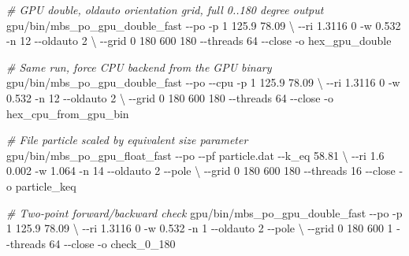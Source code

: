 \documentclass[
  10pt,
  a4paper,
]{article}
\newenvironment{Shaded}{}{}
\newcommand{\AttributeTok}[1]{\textcolor[rgb]{0.49,0.56,0.16}{#1}}
\newcommand{\CommentTok}[1]{\textcolor[rgb]{0.38,0.63,0.69}{\textit{#1}}}
\newcommand{\DataTypeTok}[1]{\textcolor[rgb]{0.56,0.13,0.00}{#1}}
\newcommand{\ExtensionTok}[1]{#1}
\newcommand{\NormalTok}[1]{#1}
\begin{document}
\begin{Shaded}
\begin{Highlighting}[]
\CommentTok{\# GPU double, oldauto orientation grid, full 0..180 degree output}
\ExtensionTok{gpu/bin/mbs\_po\_gpu\_double\_fast} \AttributeTok{{-}{-}po} \AttributeTok{{-}p}\NormalTok{ 1 125.9 78.09 }\DataTypeTok{\textbackslash{}}
    \AttributeTok{{-}{-}ri}\NormalTok{ 1.3116 0 }\AttributeTok{{-}w}\NormalTok{ 0.532 }\AttributeTok{{-}n}\NormalTok{ 12 }\AttributeTok{{-}{-}oldauto}\NormalTok{ 2 }\DataTypeTok{\textbackslash{}}
    \AttributeTok{{-}{-}grid}\NormalTok{ 0 180 600 180 }\AttributeTok{{-}{-}threads}\NormalTok{ 64 }\AttributeTok{{-}{-}close} \AttributeTok{{-}o}\NormalTok{ hex\_gpu\_double}

\CommentTok{\# Same run, force CPU backend from the GPU binary}
\ExtensionTok{gpu/bin/mbs\_po\_gpu\_double\_fast} \AttributeTok{{-}{-}po} \AttributeTok{{-}{-}cpu} \AttributeTok{{-}p}\NormalTok{ 1 125.9 78.09 }\DataTypeTok{\textbackslash{}}
    \AttributeTok{{-}{-}ri}\NormalTok{ 1.3116 0 }\AttributeTok{{-}w}\NormalTok{ 0.532 }\AttributeTok{{-}n}\NormalTok{ 12 }\AttributeTok{{-}{-}oldauto}\NormalTok{ 2 }\DataTypeTok{\textbackslash{}}
    \AttributeTok{{-}{-}grid}\NormalTok{ 0 180 600 180 }\AttributeTok{{-}{-}threads}\NormalTok{ 64 }\AttributeTok{{-}{-}close} \AttributeTok{{-}o}\NormalTok{ hex\_cpu\_from\_gpu\_bin}

\CommentTok{\# File particle scaled by equivalent size parameter}
\ExtensionTok{gpu/bin/mbs\_po\_gpu\_float\_fast} \AttributeTok{{-}{-}po} \AttributeTok{{-}{-}pf}\NormalTok{ particle.dat }\AttributeTok{{-}{-}k\_eq}\NormalTok{ 58.81 }\DataTypeTok{\textbackslash{}}
    \AttributeTok{{-}{-}ri}\NormalTok{ 1.6 0.002 }\AttributeTok{{-}w}\NormalTok{ 1.064 }\AttributeTok{{-}n}\NormalTok{ 14 }\AttributeTok{{-}{-}oldauto}\NormalTok{ 2 }\AttributeTok{{-}{-}pole} \DataTypeTok{\textbackslash{}}
    \AttributeTok{{-}{-}grid}\NormalTok{ 0 180 600 180 }\AttributeTok{{-}{-}threads}\NormalTok{ 16 }\AttributeTok{{-}{-}close} \AttributeTok{{-}o}\NormalTok{ particle\_keq}

\CommentTok{\# Two{-}point forward/backward check}
\ExtensionTok{gpu/bin/mbs\_po\_gpu\_double\_fast} \AttributeTok{{-}{-}po} \AttributeTok{{-}p}\NormalTok{ 1 125.9 78.09 }\DataTypeTok{\textbackslash{}}
    \AttributeTok{{-}{-}ri}\NormalTok{ 1.3116 0 }\AttributeTok{{-}w}\NormalTok{ 0.532 }\AttributeTok{{-}n}\NormalTok{ 1 }\AttributeTok{{-}{-}oldauto}\NormalTok{ 2 }\AttributeTok{{-}{-}pole} \DataTypeTok{\textbackslash{}}
    \AttributeTok{{-}{-}grid}\NormalTok{ 0 180 600 1 }\AttributeTok{{-}{-}threads}\NormalTok{ 64 }\AttributeTok{{-}{-}close} \AttributeTok{{-}o}\NormalTok{ check\_0\_180}
\end{Highlighting}
\end{Shaded}
\end{document}

